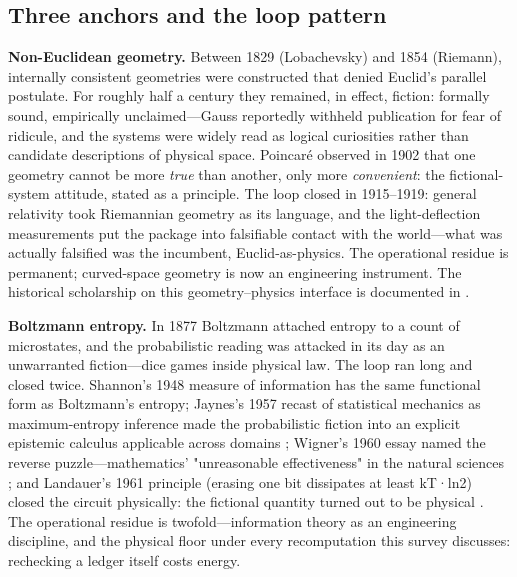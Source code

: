 \documentclass[11pt,a4paper]{article}
\begin{document}
\subsection{Three anchors and the loop pattern}

\textbf{Non-Euclidean geometry.} Between 1829 (Lobachevsky) and 1854 (Riemann), internally consistent geometries were constructed that denied Euclid's parallel postulate. For roughly half a century they remained, in effect, fiction: formally sound, empirically unclaimed—Gauss reportedly withheld publication for fear of ridicule, and the systems were widely read as logical curiosities rather than candidate descriptions of physical space. Poincaré observed in 1902 that one geometry cannot be more \textit{true} than another, only more \textit{convenient}: the fictional-system attitude, stated as a principle. The loop closed in 1915–1919: general relativity took Riemannian geometry as its language, and the light-deflection measurements put the package into falsifiable contact with the world—what was actually falsified was the incumbent, Euclid-as-physics. The operational residue is permanent; curved-space geometry is now an engineering instrument. The historical scholarship on this geometry–physics interface is documented in \cite{key15}.

\textbf{Boltzmann entropy.} In 1877 Boltzmann attached entropy to a count of microstates, and the probabilistic reading was attacked in its day as an unwarranted fiction—dice games inside physical law. The loop ran long and closed twice. Shannon's 1948 measure of information has the same functional form as Boltzmann's entropy; Jaynes's 1957 recast of statistical mechanics as maximum-entropy inference made the probabilistic fiction into an explicit epistemic calculus applicable across domains \cite{key16}; Wigner's 1960 essay named the reverse puzzle—mathematics' "unreasonable effectiveness" in the natural sciences \cite{key17}; and Landauer's 1961 principle (erasing one bit dissipates at least kT·ln2) closed the circuit physically: the fictional quantity turned out to be physical \cite{key18}. The operational residue is twofold—information theory as an engineering discipline, and the physical floor under every recomputation this survey discusses: rechecking a ledger itself costs energy.
\end{document}
